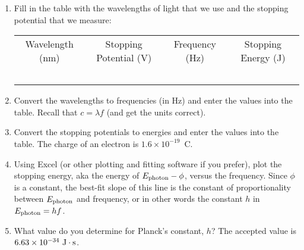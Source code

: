 \begin{enumerate}[wide]
\item Fill in the table with the wavelengths of light that we use and the stopping potential that we measure:

\begin{center} 
{\renewcommand{\arraystretch}{1.5}
\begin{tabular}{|c|c|c|c|} 
\hline
Wavelength (nm) & Stopping Potential (V) & Frequency (Hz) & Stopping Energy (J) \\ 
\hhline{|=|=|=|=|}
& & & \\ 
\hline 
& & & \\ 
\hline 
& & & \\ 
\hline 
& & & \\ 
\hline 
& & & \\ 
\hline 
\end{tabular} 
}
\end{center}

\item Convert the wavelengths to frequencies (in Hz) and enter the values into the table.  Recall that $c=\lambda f$ (and get the units correct).
\bigskip

\item Convert the stopping potentials to energies and enter the values into the table.  The charge of an electron is $1.6 \times 10^{-19}$~C.
\bigskip


\item Using Excel (or other plotting and fitting software if you prefer), plot the stopping energy, aka the energy of $E_{\rm photon} - \phi$, versus the frequency.  Since $\phi$ is a constant, the best-fit slope of this line is the constant of proportionality between $E_{\rm photon}$ and frequency, or in other words the constant $h$ in $E_{\rm photon} = hf$.
\answerspace{0.5in}


\item What value do you determine for Planck's constant, $h$?  The accepted value is 
$6.63 \times 10^{-34}~{\rm J}\cdot{\rm s}$.
\answerspace{0.5in}



\end{enumerate}
